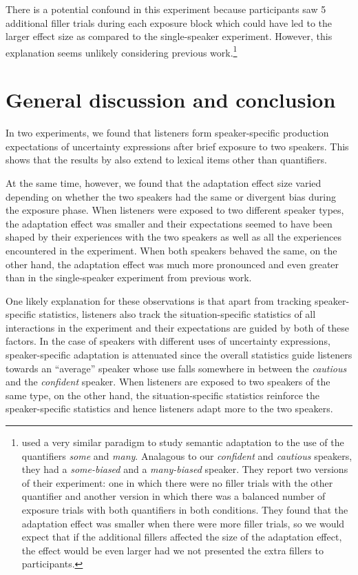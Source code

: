 There is a potential confound in this experiment because participants saw 5 additional filler trials during each exposure block which could have led to the larger effect size as compared
to the single-speaker experiment. However, this explanation seems unlikely considering previous work.\footnote{\cite{Yildirim2016} used 
a very similar paradigm to study semantic adaptation to the use of the quantifiers \textit{some} and \textit{many}. Analagous to our \textit{confident} and 
\textit{cautious} speakers, they had a \textit{some-biased} and a \textit{many-biased} speaker. They report two versions of their experiment: one in which
there were no filler trials with the other quantifier and another version in which there was a balanced number of exposure trials with both quantifiers in both conditions. They found that the adaptation effect was smaller when there were more filler trials, so we would expect that if the additional fillers affected the size of the adaptation effect, the effect would be even larger had we not presented the extra fillers to participants.}


\section{General discussion and conclusion}

In two experiments, we found that listeners form speaker-specific production expectations of 
uncertainty expressions after brief exposure to two speakers. This shows that the results
by \cite{Yildirim2016} also extend to lexical items other than quantifiers. 

At the same time, however, we found that the adaptation effect size varied depending on 
whether the two speakers had the same or divergent bias during the exposure phase.
When listeners were exposed to two different speaker types, the adaptation effect was smaller
and their expectations seemed to have been shaped by their experiences with the two speakers as well as all the experiences encountered in the experiment.
When both speakers behaved the same, on the other hand, the adaptation effect was much 
more pronounced and even greater than in the single-speaker experiment from previous work.

One likely explanation for these observations is that apart from tracking speaker-specific statistics,
listeners also track the situation-specific statistics of all interactions in the experiment and their expectations
are guided by both of these factors. In the case of speakers with different uses of uncertainty expressions,
speaker-specific adaptation is attenuated since the overall statistics guide listeners towards an ``average''
speaker whose use falls somewhere in between the \textit{cautious} and the \textit{confident} speaker. When listeners
are exposed to two speakers of the same type, on the other hand, the situation-specific statistics reinforce
the speaker-specific statistics and hence listeners adapt more to the two speakers. 

